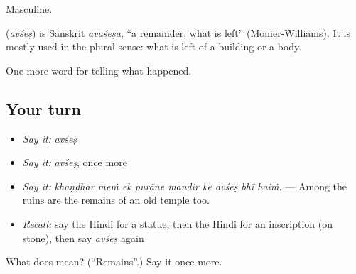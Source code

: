 Masculine.

\begin{cousinweb}
\textbf{} (\emph{avśeṣ}) is Sanskrit \emph{avaśeṣa}, \textquotedblleft{}a remainder, what is left\textquotedblright{} (Monier-Williams). It is mostly used in the plural sense: what is left of a building or a body.
\end{cousinweb}

\begin{grammarlens}[title={What you've built}]
One more word for telling what happened.
\end{grammarlens}

\subsection*{Your turn}
\begin{itemize}
\raggedright
  \item \emph{Say it:} \emph{avśeṣ}
  \item \emph{Say it:} \emph{avśeṣ}, once more
  \item \emph{Say it:} \emph{khaṇḍhar meṁ ek purāne mandir ke avśeṣ bhī haiṁ.} — Among the ruins are the remains of an old temple too.
  \item \emph{Recall:} say the Hindi for a statue, then the Hindi for an inscription (on stone), then say \emph{avśeṣ} again
\end{itemize}

\begin{tcolorbox}[breakable,colback=teal!4,colframe=teal!35!black,title={Before you move on}]
What does  mean? (\textquotedblleft{}Remains\textquotedblright{}.) Say it once more.
\end{tcolorbox}
